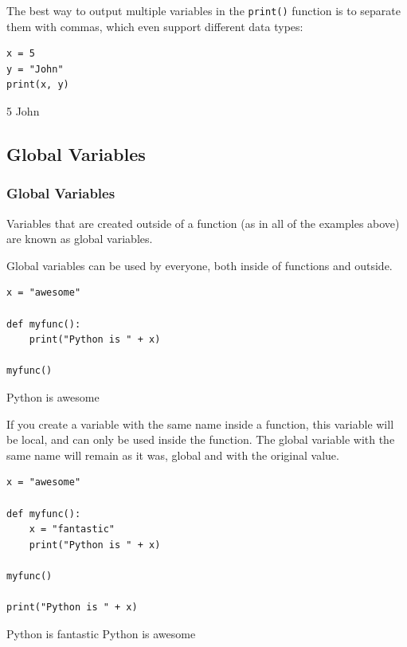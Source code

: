 \documentclass[12pt,a4paper]{article}
\newcommand{\code}[1]{%
	\colorbox{backcolour}{\lstinline{#1}}%
}
\begin{document}
The best way to output multiple variables in the \code{print()} function is to
separate them with commas, which even support different data types:

\begin{ebox}
	\begin{lstlisting}
x = 5
y = "John"
print(x, y)
	\end{lstlisting}
\tcblower
	\begin{vercode}
5 John
	\end{vercode}
\end{ebox}

\subsection{Global Variables}

\subsubsection{Global Variables}

Variables that are created outside of a function
(as in all of the examples above)
are known as global variables.

Global variables can be used by everyone, both inside of functions and outside.

\begin{ebox}
	\begin{lstlisting}
x = "awesome"

def myfunc():
    print("Python is " + x)

myfunc()
	\end{lstlisting}
\tcblower
	\begin{vercode}
Python is awesome
	\end{vercode}
\end{ebox}

If you create a variable with the same name inside a function, this variable
will be local, and can only be used inside the function. The global variable
with the same name will remain as it was, global and with the original value.

\begin{ebox}
	\begin{lstlisting}
x = "awesome"

def myfunc():
    x = "fantastic"
    print("Python is " + x)

myfunc()

print("Python is " + x)
	\end{lstlisting}
\tcblower
	\begin{vercode}
Python is fantastic
Python is awesome
	\end{vercode}
\end{ebox}
\end{document}
